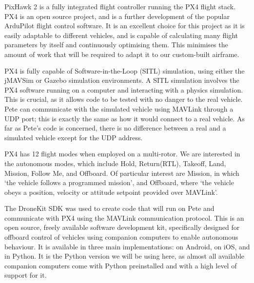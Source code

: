 \documentclass[11pt,twoside]{article}
\begin{document}
PixHawk 2 is a fully integrated flight controller running the PX4 flight stack. PX4 is an open source project, and is a further development of the popular ArduPilot flight control software. It is an excellent choice for this project as it is easily adaptable to different vehicles, and is capable of calculating many flight parameters by itself and continuously optimising them. This minimises the amount of work that will be required to adapt it to our custom-built airframe.

PX4 is fully capable of Software-in-the-Loop (SITL) simulation, using either the jMAVSim or Gazebo simulation environments\cite{PX4_dev_guide}. A SITL simulation involves the PX4 software running on a computer and interacting with a physics simulation. This is crucial, as it allows code to be tested with no danger to the real vehicle. Pete can communicate with the simulated vehicle using MAVLink through a UDP port; this is exactly the same as how it would connect to a real vehicle. As far as Pete's code is concerned, there is no difference between a real and a simulated vehicle except for the UDP address.


PX4 has 12 flight modes when employed on a multi-rotor. We are interested in the autonomous modes, which include Hold, Return(RTL), Takeoff, Land, Mission, Follow Me, and Offboard. Of particular interest are Mission, in which `the vehicle follows a programmed mission', and Offboard, where `the vehicle obeys a position, velocity or attitude setpoint provided over MAVLink'\cite{PX4_user_guide}.

The DroneKit SDK was used to create code that will run on Pete and communicate with PX4 using the MAVLink communication protocol. This is an open source, freely available software development kit, specifically designed for offboard control of vehicles using companion computers to enable autonomous behaviour. It is available in three main implementations: on Android, on iOS, and in Python. It is the Python version we will be using here, as almost all available companion computers come with Python preinstalled and with a high level of support for it.
\end{document}
